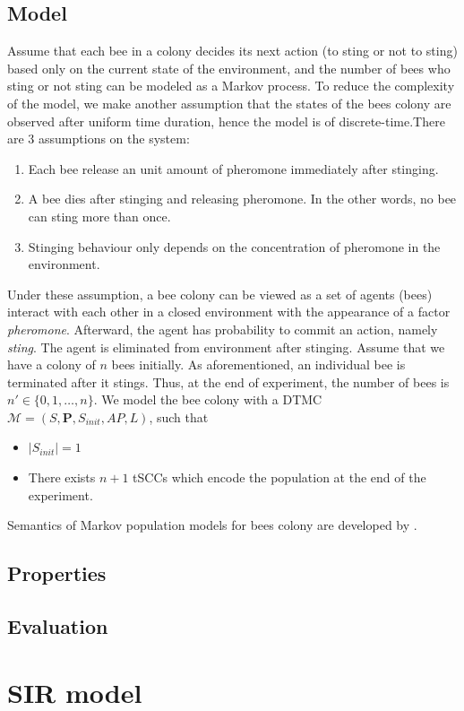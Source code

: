 \subsection{Model}
Assume that each bee in a colony decides its next action (to sting or not to
sting) based only on the current state of the environment, and the number of
bees who sting or not sting can be modeled as a Markov process. To reduce the
complexity of the model, we make another assumption that the states of the bees
colony are observed after uniform time duration, hence the model is of
discrete-time.There are 3 assumptions on the system:
\begin{enumerate}
    \item Each bee release an unit amount of pheromone immediately after stinging.
    \item A bee dies after stinging and releasing pheromone. In the other words, no
          bee can sting more than once.
    \item Stinging behaviour only depends on the concentration of pheromone in the
          environment.
\end{enumerate}
Under these assumption, a bee colony can be viewed as a set of agents (bees)
interact with each other in a closed environment with the appearance of a factor
\textit{pheromone}. Afterward, the agent has probability to commit an action, namely \textit{sting}.
The agent is eliminated from environment after stinging.
Assume that we have a colony of $n$ bees initially. As aforementioned, an individual bee
is terminated after it stings. Thus, at the end of experiment, the number of
bees is $n'\in\{0,1,\ldots,n\}$. We model the bee colony with a DTMC
$\mathcal{M}=(S,\mathbf{P}, S_{init}, AP,L)$, such that
\begin{itemize}
    \item $|S_{init}|=1$
    \item There exists $n+1$ tSCCs which encode the population at the end of the experiment.
\end{itemize}
Semantics of Markov population models for bees colony are developed by
\cite{hajnal2019data}.
\subsection{Properties}
\subsection{Evaluation}


\section{SIR model}
